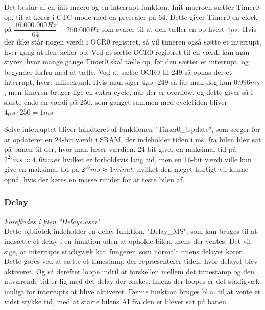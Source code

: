 Det består af en init macro og en interrupt funktion. Init macroen sætter Timer0 op, til at kører i CTC-mode med en prescaler på 64. Dette giver Timer0 en clock på $\dfrac{16.000.000Hz}{64} = 250.000Hz$ som svarer til at den tæller en op hvert $4\mu s$. Hvis der ikke står nogen værdi i OCR0 registret, så vil timeren også sætte et interrupt, hver gang at den tæller op. Ved at sætte OCR0 registret til en værdi kan man styrer, hvor mange gange Timer0 skal tælle op, før den sætter et interrupt, og begynder forfra med at tælle. Ved at sætte OCR0 til 249 så opnås der et interrupt, hvert milisekund. Hvis man siger $4\mu s  \cdot 249$ så får man dog kun $0.996 ms$, men timeren bruger lige en extra cycle, når der er overflow, og dette giver så i sidste ende en værdi på 250, som ganget sammen med cycletiden bliver $4\mu s  \cdot 250 = 1ms$ \par
Selve interruptet bliver håndteret af funktionen "Timer0\_Update", som sørger for at opdaterer en 24-bit værdi i SRAM, der indeholder tiden i ms, fra bilen blev sat på banen til der, hvor man læser værdien. 24-bit giver en maksimal tid på $2^{24} ms \approx 4,6 timer$ hvilket er forholdsvis lang tid, men en 16-bit værdi ville kun give en maksimal tid på $2^{16}ms \approx 1 minut$, hvilket den meget hurtigt vil kunne opnå, hvis der køres en masse runder for at teste bilen af.

\subsubsection{Delay}
\textit{Forefindes i filen "Delays.asm"}\\
Dette bibliotek indeholder en delay funktion, "Delay\_MS", som kan bruges til at indsætte et delay i en funktion uden at opholde bilen, mens der ventes. Det vil sige, at interrupts stadigvæk kan fungerer, som normalt imens delayet kører. Dette gøres ved at sætte et timestamp der repræsenterer tiden, hvor delayet blev aktiveret. Og så derefter loope indtil at forskellen mellem det timestamp og den nuværende tid er lig med det delay der ønskes. Imens der loopes er det stadigvæk muligt for interrupts at blive aktiveret. Denne funktion bruges bl.a. til at vente et vidst stykke tid, med at starte bilens AI fra den er blevet sat på banen


